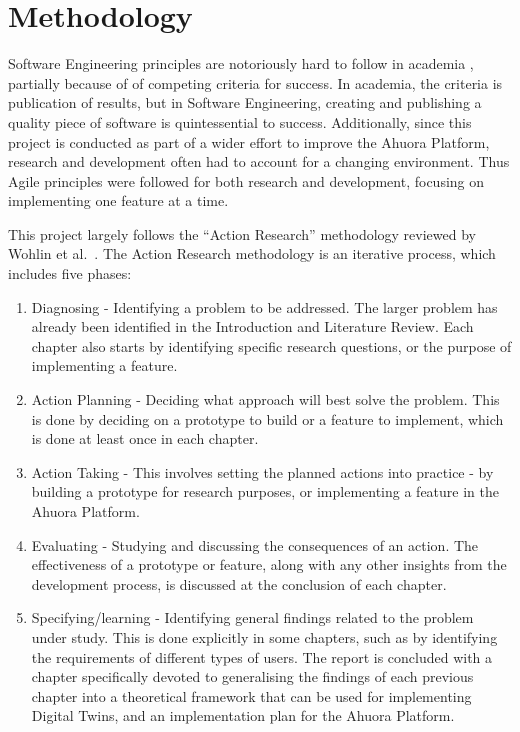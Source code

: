 \chapter{Methodology}

Software Engineering principles are notoriously hard to follow in academia \cite{connolly2023software}, partially because of of competing criteria for success. 
In academia, the criteria is publication of results, but in Software Engineering, creating and publishing a quality piece of software is quintessential to success. 
Additionally, since this project is conducted as part of a wider effort to improve the Ahuora Platform, research and development often had to account for a changing environment. 
Thus Agile principles were followed for both research and development, focusing on implementing one feature at a time. 

This project largely follows the ``Action Research'' methodology reviewed by Wohlin et al.~\cite{wohlin2021guiding}. The Action Research methodology is an iterative process, which includes five phases:

\begin{enumerate}
    \item Diagnosing - Identifying a problem to be addressed. The larger problem has already been identified in the Introduction and Literature Review. Each chapter also starts by identifying specific research questions, or the purpose of implementing a feature.
    \item Action Planning - Deciding what approach will best solve the problem. This is done by deciding on a prototype to build or a feature to implement, which is done at least once in each chapter.
    \item Action Taking - This involves setting the planned actions into practice - by building a prototype for research purposes, or implementing a feature in the Ahuora Platform.
    \item Evaluating - Studying and discussing the consequences of an action. The effectiveness of a prototype or feature, along with any other insights from the development process, is discussed at the conclusion of each chapter.
    \item Specifying/learning - Identifying general findings related to the problem under study. This is done explicitly in some chapters, such as by identifying the requirements of different types of users. The report is concluded with a chapter specifically devoted to generalising the findings of each previous chapter into a theoretical framework that can be used for implementing Digital Twins, and an implementation plan for the Ahuora Platform. 
\end{enumerate}


